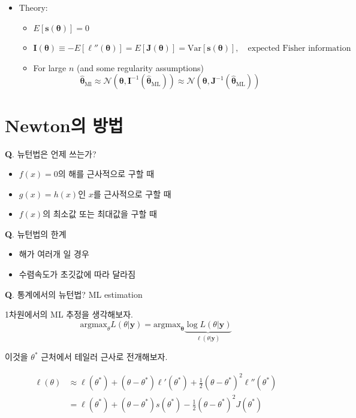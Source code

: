 \documentclass[
  letterpaper,
  DIV=11,
  numbers=noendperiod]{scrreprt}
\providecommand{\tightlist}{%
  \setlength{\itemsep}{0pt}\setlength{\parskip}{0pt}}\usepackage{longtable,booktabs,array}
\theoremstyle{definition}
\theoremstyle{definition}
\theoremstyle{remark}
\begin{document}
\begin{itemize}
\tightlist
\item
  Theory:

  \begin{itemize}
  \tightlist
  \item
    \(E[\pmb{s}(\pmb{\theta})] = 0\)
  \item
    \(\pmb{I}(\pmb{\theta}) \equiv - E[\ell '' (\pmb{\theta})] = E[\pmb{J}(\pmb{\theta})]= \text{Var}[\pmb{s}(\pmb{\theta})], \quad{} \text{expected Fisher information}\)
  \item
    For large \(n\) (and some regularity assumptions) \[
    \hat{\pmb{\theta}}_{\text{Ml}} \approx \mathcal{N}(\pmb{\theta}, \pmb{I}^{-1}(\hat{\pmb{\theta}}_{\text{ML}})) \approx \mathcal{N}(\pmb{\theta}, \pmb{J}^{-1}(\hat{\pmb{\theta}}_{\text{ML}}))
    \]
  \end{itemize}
\end{itemize}

\section{Newton의 방법}\label{newtonuxc758-uxbc29uxbc95}

\textbf{Q}. 뉴턴법은 언제 쓰는가?

\begin{itemize}
\item
  \(f(x)=0\)의 해를 근사적으로 구할 때
\item
  \(g(x)=h(x)\)인 \(x\)를 근사적으로 구할 때
\item
  \(f(x)\)의 최소값 또는 최대값을 구할 때
\end{itemize}

\textbf{Q}. 뉴턴법의 한계

\begin{itemize}
\item
  해가 여러개 일 경우
\item
  수렴속도가 초깃값에 따라 달라짐
\end{itemize}

\textbf{Q}. 통계에서의 뉴턴법? ML estimation

1차원에서의 ML 추정을 생각해보자. \[
\text{argmax}_{\theta} L(\theta | \pmb{y}) = \text{argmax}_{\pmb{\theta}}\underbrace{\log L(\theta | \pmb{y})}_{\ell (\theta | \pmb{y})}
\]

이것을 \(\theta^{*}\) 근처에서 테일러 근사로 전개해보자.

\begin{align*}
\ell (\theta) &\approx \ell (\theta^{*}) + (\theta - \theta^{*}) \ell ' (\theta^{*}) + \frac{1}{2}(\theta - \theta^{*})^2 \ell '' (\theta^{*})\\
&= \ell (\theta^{*}) + (\theta - \theta^{*}) s (\theta^{*}) - \frac{1}{2}(\theta - \theta^{*})^2 J (\theta^{*})
\end{align*}
\end{document}
